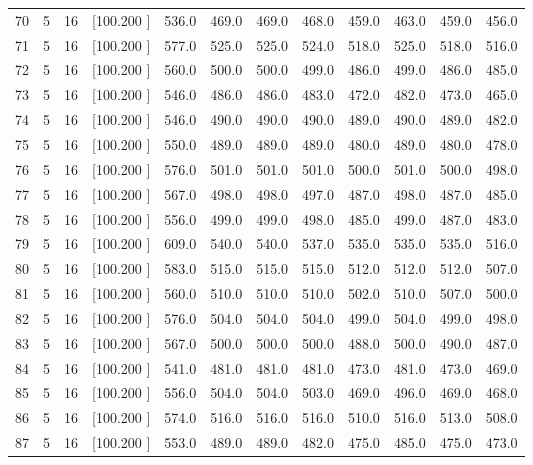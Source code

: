 \documentclass[12pt,a4paper]{article}
\begin{document}
\begin{center}
{\begin{tabular}{r r r r r r r r r r r r}
  70&  5& 16&[100.200   ]&   536.0&   469.0&   469.0&   468.0&   459.0&   463.0&   459.0&   456.0\\[-0.02in]
  71&  5& 16&[100.200   ]&   577.0&   525.0&   525.0&   524.0&   518.0&   525.0&   518.0&   516.0\\[-0.02in]
  72&  5& 16&[100.200   ]&   560.0&   500.0&   500.0&   499.0&   486.0&   499.0&   486.0&   485.0\\[-0.02in]
  73&  5& 16&[100.200   ]&   546.0&   486.0&   486.0&   483.0&   472.0&   482.0&   473.0&   465.0\\[-0.02in]
  74&  5& 16&[100.200   ]&   546.0&   490.0&   490.0&   490.0&   489.0&   490.0&   489.0&   482.0\\[-0.02in]
  75&  5& 16&[100.200   ]&   550.0&   489.0&   489.0&   489.0&   480.0&   489.0&   480.0&   478.0\\[-0.02in]
  76&  5& 16&[100.200   ]&   576.0&   501.0&   501.0&   501.0&   500.0&   501.0&   500.0&   498.0\\[-0.02in]
  77&  5& 16&[100.200   ]&   567.0&   498.0&   498.0&   497.0&   487.0&   498.0&   487.0&   485.0\\[-0.02in]
  78&  5& 16&[100.200   ]&   556.0&   499.0&   499.0&   498.0&   485.0&   499.0&   487.0&   483.0\\[-0.02in]
  79&  5& 16&[100.200   ]&   609.0&   540.0&   540.0&   537.0&   535.0&   535.0&   535.0&   516.0\\[-0.02in]
  80&  5& 16&[100.200   ]&   583.0&   515.0&   515.0&   515.0&   512.0&   512.0&   512.0&   507.0\\[-0.02in]
  81&  5& 16&[100.200   ]&   560.0&   510.0&   510.0&   510.0&   502.0&   510.0&   507.0&   500.0\\[-0.02in]
  82&  5& 16&[100.200   ]&   576.0&   504.0&   504.0&   504.0&   499.0&   504.0&   499.0&   498.0\\[-0.02in]
  83&  5& 16&[100.200   ]&   567.0&   500.0&   500.0&   500.0&   488.0&   500.0&   490.0&   487.0\\[-0.02in]
  84&  5& 16&[100.200   ]&   541.0&   481.0&   481.0&   481.0&   473.0&   481.0&   473.0&   469.0\\[-0.02in]
  85&  5& 16&[100.200   ]&   556.0&   504.0&   504.0&   503.0&   469.0&   496.0&   469.0&   468.0\\[-0.02in]
  86&  5& 16&[100.200   ]&   574.0&   516.0&   516.0&   516.0&   510.0&   516.0&   513.0&   508.0\\[-0.02in]
  87&  5& 16&[100.200   ]&   553.0&   489.0&   489.0&   482.0&   475.0&   485.0&   475.0&   473.0\\[-0.02in]

\end{tabular}}
\end{center}
\end{document}
